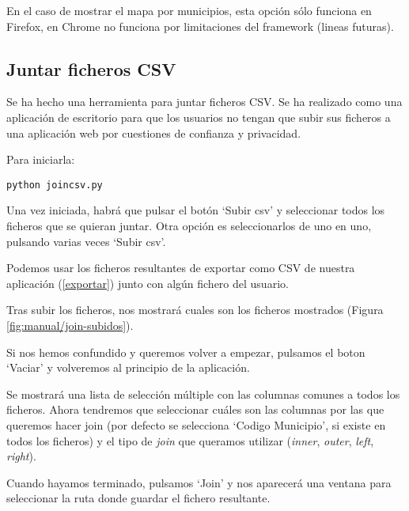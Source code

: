En el caso de mostrar el mapa por municipios, esta opción sólo funciona en Firefox, en Chrome no funciona por limitaciones del framework (lineas futuras).

\newpage

\subsection{Juntar ficheros CSV}

Se ha hecho una herramienta para juntar ficheros CSV. Se ha realizado como una aplicación de escritorio para que los usuarios no tengan que subir sus ficheros a una aplicación web por cuestiones de confianza y privacidad.

Para iniciarla:

\begin{lstlisting}
python joincsv.py
\end{lstlisting}


Una vez iniciada, habrá que pulsar el botón `Subir csv' y seleccionar todos los ficheros que se quieran juntar. Otra opción es seleccionarlos de uno en uno, pulsando varias veces `Subir csv'.

Podemos usar los ficheros resultantes de exportar como CSV de nuestra aplicación (\ref{exportar}) junto con algún fichero del usuario.

Tras subir los ficheros, nos mostrará cuales son los ficheros mostrados (Figura \ref{fig:manual/join-subidos}).


Si nos hemos confundido y queremos volver a empezar, pulsamos el boton `Vaciar' y volveremos al principio de la aplicación.

Se mostrará una lista de selección múltiple con las columnas comunes a todos los ficheros. Ahora tendremos que seleccionar cuáles son las columnas por las que queremos hacer join (por defecto se selecciona `Codigo Municipio', si existe en todos los ficheros) y el tipo de \textit{join} que queramos utilizar (\textit{inner}, \textit{outer}, \textit{left}, \textit{right}).

Cuando hayamos terminado, pulsamos `Join' y nos aparecerá una ventana para seleccionar la ruta donde guardar el fichero resultante.

